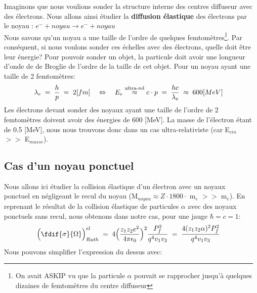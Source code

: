 Imaginons que nous voulions sonder la structure interne des centres diffuseur avec des électrons. Nous allons ainsi étudier la \textbf{diffusion élastique} des électrons par le noyau : $e^- + noyau \rightarrow e^- + noyau$\\
Nous savons qu'un noyau a une taille de l'ordre de quelques femtomètres\footnote{On avait ASKIP vu que la particule $\alpha$ pouvait se rapprocher jusqu'à quelques dizaines de femtomètres du centre diffuseur}. Par conséquent, si nous voulons sonder ces échelles avec des électrons, quelle doit être leur énergie? Pour pouvoir sonder un objet, la particule doit avoir une longueur d'onde de de Broglie de l'ordre de la taille de cet objet. Pour un noyau ayant une taille de 2 femtomètres:
\begin{equation}
    \lambda_e \; = \; \dfrac{h}{p} \; = \; 2[fm]
    \quad \Leftrightarrow \quad
    E_e \stackrel{\text{ultra-rel}}{\approx}c\cdot p \; = \; \dfrac{hc}{\lambda_e} 
    \; \approx \;
    600 [MeV]
\end{equation}
Les électrons devant sonder des noyaux ayant une taille de l'ordre de 2 femtomètres doivent avoir des énergies de 600 [MeV]. La masse de l'électron étant de 0.5 [MeV], nous nous trouvons donc dans un cas ultra-relativiste (car E$_{cin}$ $>>$ E$_{masse}$).


\subsection{Cas d'un noyau ponctuel}


Nous allons ici étudier la collision élastique d'un électron avec un noyaux ponctuel en négligeant le recul du noyau (M$_{noyau}\approx Z \cdot 1800 \cdot$ m$_e$ $>>$ m$_e$). En reprenant le résultat de la collision élastique de particules $\alpha$ avec des noyaux ponctuels sans recul, nous obtenons dans notre cas, pour une jauge $\hbar=c=1$:
\begin{equation*}
    \Big(  \fdif{\sigma}{\Omega} \Big)_{Ruth}^{el}
    \eq
    4 \Big( \dfrac{z_1 z_2e^2}{4\pi\epsilon_0} \Big)^2 \dfrac{P_f^2}{q^4v_1v_3}
    \eq
    \dfrac{4 (z_1 z_2 \alpha)^2 P_f^2}{q^4v_1v_3}
\end{equation*}
Nous pouvons simplifier l'expression du dessus avec:

